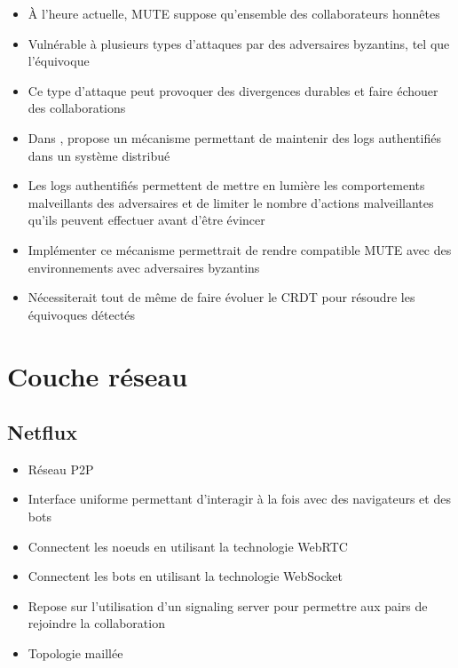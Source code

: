 \documentclass[12pt]{thesul}
\begin{document}
\begin{itemize}
  \item À l'heure actuelle, MUTE suppose qu'ensemble des collaborateurs honnêtes
  \item Vulnérable à plusieurs types d'attaques par des adversaires byzantins, tel que l'équivoque
  \item Ce type d'attaque peut provoquer des divergences durables et faire échouer des collaborations
  \item Dans \cite{2018-prunable-authenticated-log, 2021-these-vic}, \citeauthor{2021-these-vic} propose un mécanisme permettant de maintenir des logs authentifiés dans un système distribué
  \item Les logs authentifiés permettent de mettre en lumière les comportements malveillants des adversaires et de limiter le nombre d'actions malveillantes qu'ils peuvent effectuer avant d'être évincer
  \item Implémenter ce mécanisme permettrait de rendre compatible MUTE avec des environnements avec adversaires byzantins
  \item Nécessiterait tout de même de faire évoluer le \ac{CRDT} pour résoudre les équivoques détectés
\end{itemize}

\section{Couche réseau}
\subsection{Netflux}
\begin{itemize}
  \item Réseau P2P
  \item Interface uniforme permettant d'interagir à la fois avec des navigateurs et des bots
  \item Connectent les noeuds en utilisant la technologie WebRTC
  \item Connectent les bots en utilisant la technologie WebSocket
  \item Repose sur l'utilisation d'un signaling server pour permettre aux pairs de rejoindre la collaboration
  \item Topologie maillée
\end{itemize}
\end{document}

